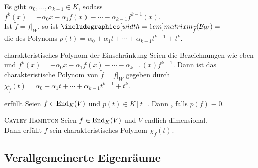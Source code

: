 \begin{Bem}
    Es gibt $\alpha_0, \dotsc, \alpha_{k-1} \in K$, sodass
    $f^k(x) = -\alpha_0 x - \alpha_1 f(x) - \dotsb -
    \alpha_{k-1} f^{k-1}(x)$. \\
    Ist $\widetilde{f} = f|_W$, so ist
    $\matrixm_{\widetilde{f}}(\basis{B}_W) =$
     \\
    die  des Polynoms
    $p(t) = \alpha_0 + \alpha_1 t + \dotsb + \alpha_{k-1} t^{k-1} + t^k$.
\end{Bem}

\begin{Satz}{charakteristisches Polynom der Einschränkung}
    Seien die Bezeichnungen wie eben und
    $f^k(x) = -\alpha_0 x - \alpha_1 f(x) - \dotsb - \alpha_{k-1}(x) f^{k-1}$.
    Dann ist das charakteristische Polynom von $\widetilde{f} = f|_W$
    gegeben durch
    $\chi_{\widetilde{f}}(t) = \alpha_0 + \alpha_1 t + \dotsb +
    \alpha_{k-1} t^{k-1} + t^k$.
\end{Satz}

\begin{Def}{erfüllt}
    Seien $f \in \operatorname{End}_K(V)$ und $p(t) \in K[t]$.
    Dann , falls
    $p(f) \equiv 0$.
\end{Def}

\begin{Satz}{\textsc{Cayley}-\textsc{Hamilton}}
    Seien $f \in \operatorname{End}_K(V)$ und $V$ endlich-dimensional. \\
    Dann erfüllt $f$ sein charakteristisches Polynom $\chi_f(t)$.
\end{Satz}

\pagebreak

\subsection{%
    Verallgemeinerte Eigenräume%
}

